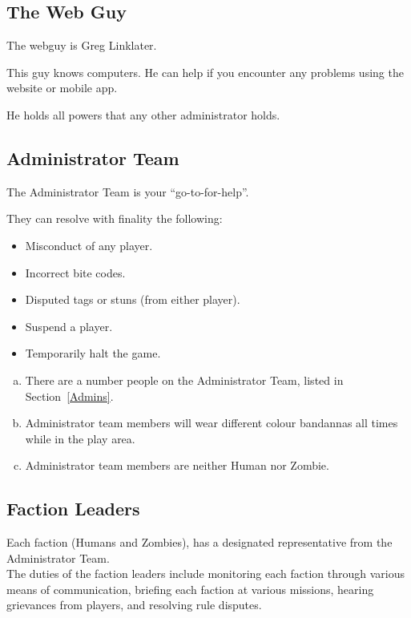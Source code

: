 \documentclass[a4paper,12pt]{article}
\newcommand{\theWebDude}{Greg Linklater}
\begin{document}
\subsection{The Web Guy}
The webguy is \theWebDude. 

This guy knows computers. He can help if you encounter any problems using the website or mobile app.

He holds all powers that any other administrator holds.

\subsection{Administrator Team}

The Administrator Team is your ``go-to-for-help''.

They can resolve with finality the following:

\begin{itemize}
    \item {Misconduct of any player.}
    \item {Incorrect bite codes.}
    \item {Disputed tags or stuns (from either player).}
    \item {Suspend a player.}
    \item {Temporarily halt the game.}
\end{itemize}

\begin{enumerate}[(a)]
    \item There are a number people on the Administrator Team, listed in Section~\ref{Admins}.
    \item Administrator team members will wear different colour bandannas all times while in the play area.
    \item Administrator team members are neither Human nor Zombie.
\end{enumerate}{}

\subsection{Faction Leaders}
Each faction (Humans and Zombies), has a designated representative from the Administrator Team.\\

The duties of the faction leaders include monitoring each faction through various means of communication, briefing each faction at various missions, hearing grievances from players, and resolving rule disputes.
\end{document}
